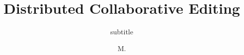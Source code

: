 \documentclass[12pt,french,fancyChapter,fancyPart,squeezeCommittee]{these-LUNAM}
\title{Distributed Collaborative Editing}
\subtitle{subtitle}
\author{M.}{Brice}{Nédelec}
\date{}
\begin{document}


\maketitle




%
%
%




\raggedright

\clearpage

\backmatter

\tableofcontents
\listoftables
\listoffigures
\end{document}
